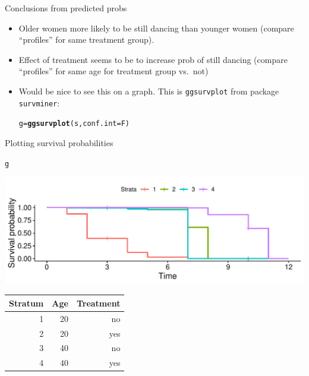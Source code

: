 \documentclass[unknownkeysallowed]{beamer}\usepackage[]{graphicx}\usepackage[]{color}
\makeatletter
\def\maxwidth{ %
  \ifdim\Gin@nat@width>\linewidth
    \linewidth
  \else
    \Gin@nat@width
  \fi
}
\newcommand{\hlstd}[1]{\textcolor[rgb]{0.345,0.345,0.345}{#1}}%
\newcommand{\hlkwb}[1]{\textcolor[rgb]{0.69,0.353,0.396}{#1}}%
\newcommand{\hlkwc}[1]{\textcolor[rgb]{0.333,0.667,0.333}{#1}}%
\newcommand{\hlkwd}[1]{\textcolor[rgb]{0.737,0.353,0.396}{\textbf{#1}}}%
\newenvironment{kframe}{%
 \def\at@end@of@kframe{}%
 \ifinner\ifhmode%
  \def\at@end@of@kframe{\end{minipage}}%
  \begin{minipage}{\columnwidth}%
 \fi\fi%
 \def\FrameCommand##1{\hskip\@totalleftmargin \hskip-\fboxsep
 \colorbox{shadecolor}{##1}\hskip-\fboxsep
     \hskip-\linewidth \hskip-\@totalleftmargin \hskip\columnwidth}%
 \MakeFramed {\advance\hsize-\width
   \@totalleftmargin\z@ \linewidth\hsize
   \@setminipage}}%
 {\par\unskip\endMakeFramed%
 \at@end@of@kframe}
\newenvironment{knitrout}{}{} %
\makeatother
\begin{document}
\begin{frame}[fragile]{Conclusions from predicted probs}

  \begin{itemize}
  \item Older women more likely to be still dancing than younger women
    (compare ``profiles'' for same treatment group).
  \item Effect of treatment seems to be to increase prob of still
    dancing (compare ``profiles'' for same age for treatment group
    vs.\ not)
  \item Would be nice to see this on a graph. This is \texttt{ggsurvplot} from package \texttt{survminer}:
\begin{knitrout}
\color{fgcolor}\begin{kframe}
\begin{alltt}
\hlstd{g}\hlkwb{=}\hlkwd{ggsurvplot}\hlstd{(s,}\hlkwc{conf.int}\hlstd{=F)}
\end{alltt}
\end{kframe}
\end{knitrout}
    
    
  \end{itemize}
  
\end{frame}

\begin{frame}[fragile]{Plotting survival probabilities}
  
\begin{knitrout}
\color{fgcolor}\begin{kframe}
\begin{alltt}
\hlstd{g}
\end{alltt}
\end{kframe}
\includegraphics[width=\maxwidth]{figure/unnamed-chunk-132-1} 

\end{knitrout}

\begin{small}
\begin{tabular}{rrr}
  Stratum& Age& Treatment \\
  \hline
  1 & 20 & no\\
  2 & 20 & yes\\
  3 & 40 & no\\
  4 & 40 & yes\\
  \hline
\end{tabular}  
\end{small}
  
\end{frame}
\end{document}
